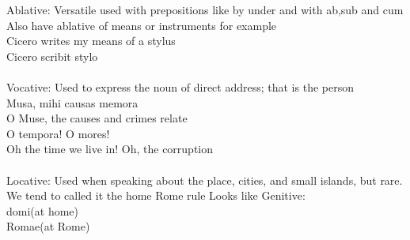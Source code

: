 \large{Ablative:} Versatile used with prepositions like by under and with ab,sub and cum
Also have ablative of means or instruments for example \\ 
Cicero writes my means of a stylus \\ 
Cicero scribit stylo \\ \\ 
\large{Vocative:} Used to express the noun of direct address; that is the person \\ 
Musa, mihi causas memora \\ 
O Muse, the causes and crimes relate \\ 
O tempora! O mores! \\
Oh the time we live in! Oh, the corruption \\ \\ 
\large{Locative:} Used when speaking about the place, cities, and small islands, but rare. We tend to called
it the home Rome rule Looks like Genitive: \\ 
domi(at home) \\ 
Romae(at Rome) \\
